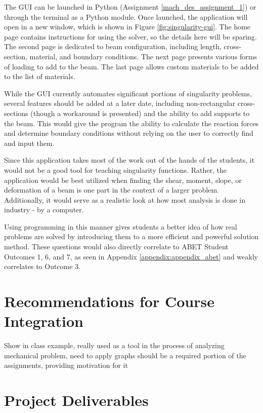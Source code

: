 The GUI can be launched in Python (Assignment \ref{mach_des_assignment_1}) or through
the terminal as a Python module. Once launched, the application will open in a new window, which is shown
in Figure \ref{fig:singularity-gui}. The home page contains instructions for using the solver, so the details 
here will be sparing. The second page is dedicated to beam configuration, including length, cross-section, 
material, and boundary conditions. The next page presents various forms of loading to add
to the beam. The last page allows custom materials to be added to the list of materials.

While the GUI currently automates significant portions of singularity problems, several features should be
added at a later date, including non-rectangular cross-sections (though a workaround is presented) and
the ability to add supports to the beam. This would give the program the ability to calculate the reaction
forces and determine boundary conditions without relying on the user to correctly find and input them.

Since this application takes most of the work out of the hands of the students, it would not be a good tool
for teaching singularity functions. Rather, the application would be best utilized when finding the shear,
moment, slope, or deformation of a beam is one part in the context of a larger problem. Additionally, 
it would serve as a realistic look at how most analysis is done in industry - by a computer.

Using programming in this manner gives students a better idea of how real problems are solved by
introducing them to a more efficient and powerful solution method. These questions would also 
directly correlate to ABET Student Outcomes 1, 6, and 7, as seen in Appendix 
\ref{appendix:appendix_abet} and weakly correlates to Outcome 3.

\section{Recommendations for Course Integration}

Show in class example, really used as a tool in the process of analyzing mechanical problem, need to apply
graphs should be a required portion of the assignments, providing motivation for it

\section{Project Deliverables}

